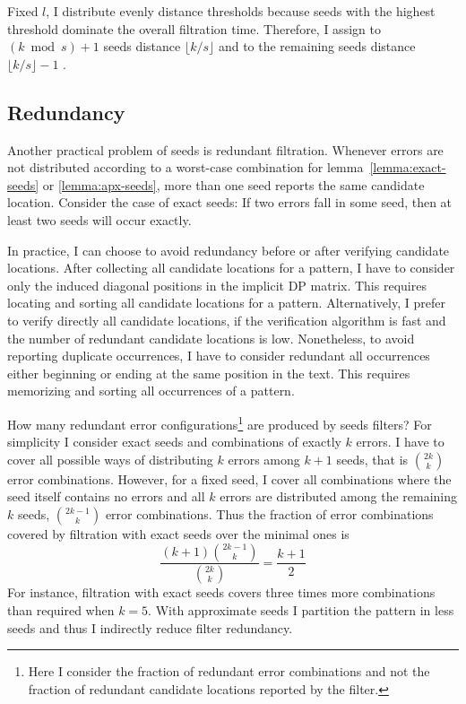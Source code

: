 Fixed $l$, I distribute evenly distance thresholds because seeds with the highest threshold dominate the overall filtration time.
Therefore, I assign to $(k \bmod{s}) + 1$ seeds distance $\lfloor k/s \rfloor$ and to the remaining seeds distance $\lfloor k/s \rfloor - 1$ \citep{Siragusa2013}.

\subsection{Redundancy}

Another practical problem of seeds is redundant filtration.
Whenever errors are not distributed according to a worst-case combination for lemma~\ref{lemma:exact-seeds} or \ref{lemma:apx-seeds}, more than one seed reports the same candidate location.
Consider the case of exact seeds: If two errors fall in some seed, then at least two seeds will occur exactly.

In practice, I can choose to avoid redundancy before or after verifying candidate locations.
After collecting all candidate locations for a pattern, I have to consider only the induced diagonal positions in the implicit DP matrix.
This requires locating and sorting all candidate locations for a pattern.
Alternatively, I prefer to verify directly all candidate locations, \eg if the verification algorithm is fast and the number of redundant candidate locations is low.
Nonetheless, to avoid reporting duplicate occurrences, I have to consider redundant all occurrences either beginning or ending at the same position in the text.
This requires memorizing and sorting all occurrences of a pattern.

How many redundant error configurations\footnote{Here I consider the fraction of redundant error combinations and not the fraction of redundant candidate locations reported by the filter.} are produced by seeds filters?
For simplicity I consider exact seeds and combinations of exactly $k$ errors.
I have to cover all possible ways of distributing $k$ errors among $k+1$ seeds, that is $\binom{2k}{k}$ error combinations.
However, for a fixed seed, I cover all combinations where the seed itself contains no errors and all $k$ errors are distributed among the remaining $k$ seeds, \ie $\binom{2k-1}{k}$ error combinations.
Thus the fraction of error combinations covered by filtration with exact seeds over the minimal ones is
\begin{equation}
\frac{(k+1)\binom{2k-1}{k}}{\binom{2k}{k}} = \frac{k+1}{2}
\end{equation}
For instance, filtration with exact seeds covers three times more combinations than required when $k=5$.
With approximate seeds I partition the pattern in less seeds and thus I indirectly reduce filter redundancy.

